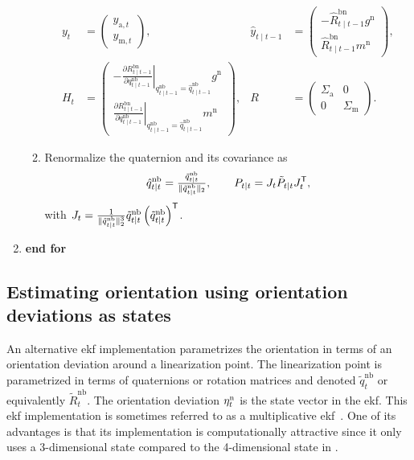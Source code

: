 \begin{algorithm}[ht]
\begin{enumerate}
\begin{enumerate}
\begin{align*}
y_t &= \begin{pmatrix} y_{\text{a},t} \\ y_{\text{m},t} \end{pmatrix}, & 
\hat{y}_{t \mid t-1} &= \begin{pmatrix} -\hat{R}^\text{bn}_{t \mid t-1} g^\text{n} \\ \hat{R}^\text{bn}_{t \mid t-1} m^\text{n} \end{pmatrix}, \\
H_t &= \begin{pmatrix} - \left. \tfrac{\partial R^\text{bn}_{t \mid t-1}}{\partial q^\text{nb}_{t \mid t-1}} \right|_{q^\text{nb}_{t \mid t-1}=\hat{q}^\text{nb}_{t \mid t-1}} g^\text{n} \\ \left. \tfrac{\partial R^\text{bn}_{t \mid t-1}}{\partial q^\text{nb}_{t \mid t-1}} \right|_{q^\text{nb}_{t \mid t-1}=\hat{q}^\text{nb}_{t \mid t-1}} m^\text{n} \end{pmatrix}, & 
R &= \begin{pmatrix} \Sigma_\text{a} & 0 \\ 0 & \Sigma_\text{m} \end{pmatrix}.
\end{align*}
\item Renormalize the quaternion and its covariance as
\begin{align}
\hat{q}_{t \mid t}^\text{nb} = \tfrac{\tilde{q}^\text{nb}_{t \mid t}}{\| \tilde{q}^\text{nb}_{t \mid t}\|_2} , \qquad
P_{t \mid t} = J_t \tilde{P}_{t \mid t} J_t^{\mathsf{T}},
\end{align}
with $J_t = \tfrac{1}{\| \tilde{q}^\text{nb}_{t \mid t} \|_2^3} \tilde{q}^\text{nb}_{t \mid t} \left( \tilde{q}^\text{nb}_{t \mid t} \right)^{\mathsf{T}}$.
\end{enumerate}
\item[] \textbf{end for}
\end{enumerate}
\normalsize
\end{algorithm}

\subsection{Estimating orientation using orientation deviations as states}
\label{sec:oriEst-oriError-ekf}
An alternative \gls{ekf} implementation parametrizes the orientation in terms of an orientation deviation around a linearization point. The linearization point is parametrized in terms of quaternions or rotation matrices and denoted $\tilde{q}^\text{nb}_t$ or equivalently $\tilde{R}^\text{nb}_t$. The orientation deviation $\eta_t^\text{n}$ is the state vector in the \gls{ekf}. This \gls{ekf} implementation is sometimes referred to as a multiplicative \gls{ekf}~\citep{crassidisMC:2007,markley:2003}. One of its advantages is that its implementation is computationally attractive since it only uses a 3-dimensional state compared to the 4-dimensional state in .

